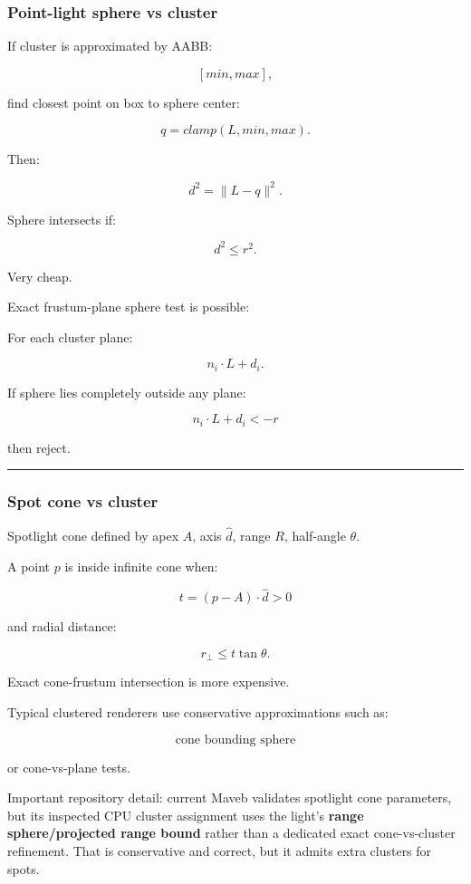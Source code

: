\subsubsection{Point-light sphere vs cluster}\label{point-light-sphere-vs-cluster}

If cluster is approximated by AABB:

\[
[min,max],
\]

find closest point on box to sphere center:

\[
q=
clamp(
L,
min,
max
).
\]

Then:

\[
d^2=
\|L-q\|^2.
\]

Sphere intersects if:

\[
\boxed{
d^2\le r^2.
}
\]

Very cheap.

Exact frustum-plane sphere test is possible:

For each cluster plane:

\[
n_i\cdot L+d_i.
\]

If sphere lies completely outside any plane:

\[
n_i\cdot L+d_i<-r
\]

then reject.

\begin{center}\rule{0.5\linewidth}{0.5pt}\end{center}

\subsubsection{Spot cone vs cluster}\label{spot-cone-vs-cluster}

Spotlight cone defined by apex \(A\), axis \(\hat d\), range \(R\), half-angle \(\theta\).

A point \(p\) is inside infinite cone when:

\[
t=
(p-A)\cdot\hat d>0
\]

and radial distance:

\[
r_\perp
\le
t\tan\theta.
\]

Exact cone-frustum intersection is more expensive.

Typical clustered renderers use conservative approximations such as:

\[
\text{cone bounding sphere}
\]

or cone-vs-plane tests.

Important repository detail: current Maveb validates spotlight cone parameters, but its inspected CPU cluster assignment uses the light's \textbf{range sphere/projected range bound} rather than a dedicated exact cone-vs-cluster refinement. That is conservative and correct, but it admits extra clusters for spots.

